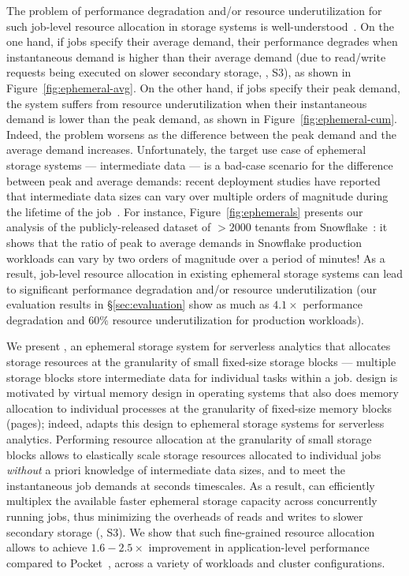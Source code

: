 The problem of performance degradation and/or resource underutilization for such job-level resource allocation in storage systems is well-understood~\cite{qoop, snowset}. On the one hand, if jobs specify their average demand, their performance degrades when instantaneous demand is higher than their average demand (due to read/write requests being executed on slower secondary storage, \eg, S3), as shown in Figure~\ref{fig:ephemeral-avg}. On the other hand, if jobs specify their peak demand, the system suffers from resource underutilization when their instantaneous demand is lower than the peak demand, as shown in Figure~\ref{fig:ephemeral-cum}. Indeed, the problem worsens as the difference between the peak demand and the average demand increases. Unfortunately, the target use case of ephemeral storage systems --- intermediate data --- is a bad-case scenario for the difference between peak and average demands: recent deployment studies have reported that intermediate data sizes can vary over multiple orders of magnitude during the lifetime of the job~\cite{snowset}. For instance, Figure~\ref{fig:ephemerals} presents our analysis of the publicly-released dataset of $>2000$ tenants from Snowflake~\cite{snowset}: it shows that the ratio of peak to average demands in Snowflake production workloads can vary by two orders of magnitude over a period of minutes! As a result, job-level resource allocation in existing ephemeral storage systems can lead to significant performance degradation and/or resource underutilization (our evaluation results in \S\ref{sec:evaluation} show as much as $4.1\times$ performance degradation and $60\%$ resource underutilization for production workloads).

We present \jiffy, an ephemeral storage system for serverless analytics that allocates storage resources at the granularity of small fixed-size storage blocks --- multiple storage blocks store intermediate data for individual tasks within a job. \jiffy design is motivated by virtual memory design in operating systems that also does memory allocation to individual processes at the granularity of fixed-size memory blocks (pages); indeed, \jiffy adapts this design to ephemeral storage systems for serverless analytics. Performing resource allocation at the granularity of small storage blocks allows \jiffy to elastically scale storage resources allocated to individual jobs {\em without} a priori knowledge of intermediate data sizes, and to meet the instantaneous job demands at seconds timescales. As a result, \jiffy can efficiently multiplex the available faster ephemeral storage capacity across concurrently running jobs, thus minimizing the overheads of reads and writes to slower secondary storage (\eg, S3). We show that such fine-grained resource allocation allows \jiffy to achieve $1.6-2.5\times$ improvement in application-level performance compared to Pocket~\cite{pocket}, across a variety of workloads and cluster configurations. 

